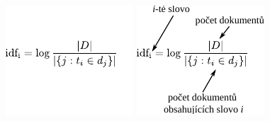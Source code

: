 \documentclass{beamer}
\begin{document}
\begin{frame}
\begin{columns}
    \begin{overprint}
      \centering\includegraphics[width=.5\textwidth,height=\textheight,keepaspectratio]{figures/idf.pdf}
      \centering\includegraphics[width=.5\textwidth,height=\textheight,keepaspectratio]{figures/idf_described.pdf}
    \end{overprint}
\end{columns}

\end{frame}
\end{document}
